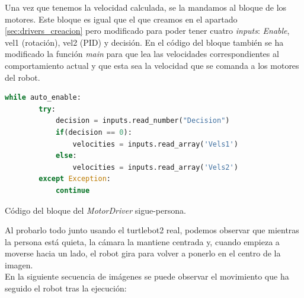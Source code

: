 Una vez que tenemos la velocidad calculada, se la mandamos al bloque de los motores. Este bloque es igual que el que creamos en el apartado
\ref{sec:drivers_creacion} pero modificado para poder tener cuatro \textit{inputs}: \textit{Enable}, vel1 (rotación), vel2 (PID) y decisión.
En el código del bloque también se ha modificado la función \textit{main} para que lea las velocidades correspondientes al comportamiento actual y
que esta sea la velocidad que se comanda a los motores del robot.\\

\begin{code}[H]
    \begin{lstlisting}[language=python]
    while auto_enable:
        try:
            decision = inputs.read_number("Decision")
            if(decision == 0):
                velocities = inputs.read_array('Vels1')
            else:
                velocities = inputs.read_array('Vels2')
        except Exception:
            continue
\end{lstlisting}
\caption[Código bloque MotorDriver sigue-persona]{Código del bloque del \textit{MotorDriver} sigue-persona.}
\label{cod:MotorDriver_FP}
\end{code}

Al probarlo todo junto usando el turtlebot2 real, podemos observar que mientras la persona está quieta, la cámara la mantiene centrada y,
cuando empieza a moverse hacia un lado, el robot gira para volver a ponerlo en el centro de la imagen.\\

En la siguiente secuencia de imágenes se puede observar el movimiento que ha seguido el robot tras la ejecución:

